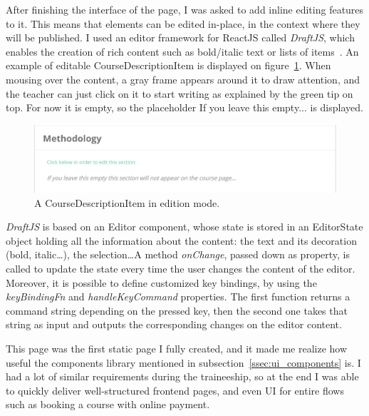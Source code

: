 After finishing the interface of the page, I was asked to add inline editing features to it. This means that elements can be edited in-place, in the context where they will be published. I used an editor framework for ReactJS called \textit{DraftJS}, which enables the creation of rich content such as bold/italic text or lists of items~\cite{draftJS}. An example of editable \guillemotleft{} CourseDescriptionItem \guillemotright{} is displayed on {\sc figure}~\ref{fig:courseEdit}. When mousing over the content, a gray frame appears around it to draw attention, and the teacher can just click on it to start writing as explained by the green tip on top. For now it is empty, so the placeholder \guillemotleft{} If you leave this empty... \guillemotright{} is displayed.

\begin{figure}[H]
    \centering
    \includegraphics[scale=0.4]{figure/courseEdit.png}
    \caption{A \guillemotleft{} CourseDescriptionItem \guillemotright{} in edition mode.}
    \label{fig:courseEdit}
\end{figure}

\textit{DraftJS} is based on an \guillemotleft{} Editor \guillemotright{} component, whose state is stored in an \guillemotleft{} EditorState \guillemotright{} object holding all the information about the content: the text and its decoration (bold, italic\ldots), the selection\ldots A method \textit{onChange}, passed down as property, is called to update the state every time the user changes the content of the editor. Moreover, it is possible to define customized key bindings, by using the \textit{keyBindingFn} and \textit{handleKeyCommand} properties. The first function returns a command string depending on the pressed key, then the second one takes that string as input and outputs the corresponding changes on the editor content.

This page was the first static page I fully created, and it made me realize how useful the components library mentioned in {\sc subsection}~\ref{ssec:ui_components} is. I had a lot of similar requirements during the traineeship, so at the end I was able to quickly deliver well-structured frontend pages, and even UI for entire flows such as booking a course with online payment.

